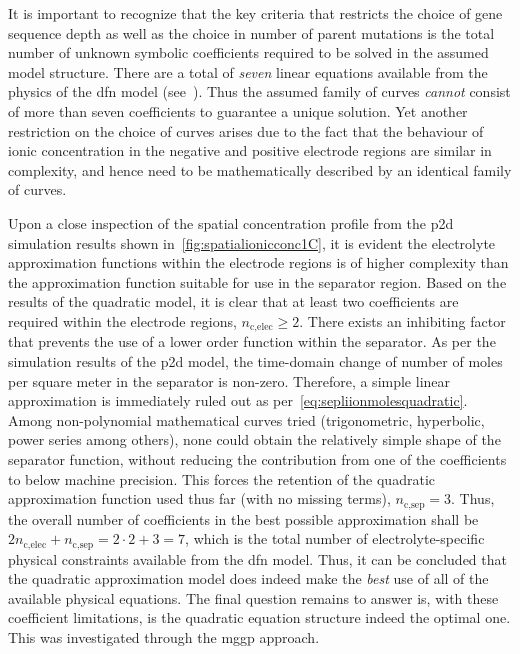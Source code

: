 It  is  important  to  recognize  that  the  key  criteria  that  restricts  the
choice  of gene  sequence  depth as  well  as  the choice  in  number of  parent
mutations  is  the  total  number  of  unknown  symbolic  coefficients  required
to  be   solved  in  the  assumed   model  structure.  There  are   a  total  of
\emph{seven} linear equations available from  the physics of the \gls{dfn} model
(see~).  Thus the  assumed
family  of curves  \emph{cannot}  consist  of more  than  seven coefficients  to
guarantee a  unique solution. Yet  another restriction  on the choice  of curves
arises due to the fact that the behaviour of ionic concentration in the negative
and positive electrode  regions are similar in complexity, and  hence need to be
mathematically described by an identical family of curves.

Upon a close inspection of the  spatial concentration profile from the \gls{p2d}
simulation  results shown  in~\cref{fig:spatialionicconc1C}, it  is evident  the
electrolyte approximation  functions within the  electrode regions is  of higher
complexity than  the approximation  function suitable for  use in  the separator
region. Based on the  results of the quadratic model, it is  clear that at least
two coefficients  are required within the  electrode regions, $n_{\text{c,elec}}
\ge  2$.  There  exists  an  inhibiting  factor  that  prevents  the  use  of  a
lower  order  function within  the  separator.  As  per the  simulation  results
of  the  \gls{p2d}  model,  the  time-domain  change  of  number  of  moles  per
square  meter  in  the  separator   is  non-zero.  Therefore,  a  simple  linear
approximation is immediately  ruled out as per~\cref{eq:sepliionmolesquadratic}.
Among non-polynomial mathematical curves tried (trigonometric, hyperbolic, power
series  among  others),  none  could  obtain  the  relatively  simple  shape  of
the  separator function,  without  reducing  the contribution  from  one of  the
coefficients  to below  machine  precision.  This forces  the  retention of  the
quadratic approximation  function used thus  far (with no missing  terms), \ie{}
$n_\text{c,sep}  = 3$.  Thus, the  overall number  of coefficients  in the  best
possible approximation shall be $2  n_\text{c,elec} + n_\text{c,sep} = 2\cdot2 +
3 = 7$,  which is the total number of  electrolyte-specific physical constraints
available from the \gls{dfn} model. Thus, it can be concluded that the quadratic
approximation model does indeed make the \emph{best} use of all of the available
physical  equations.  The  final  question  remains to  answer  is,  with  these
coefficient limitations, is the quadratic  equation structure indeed the optimal
one. This was investigated through the \gls{mggp} approach.

